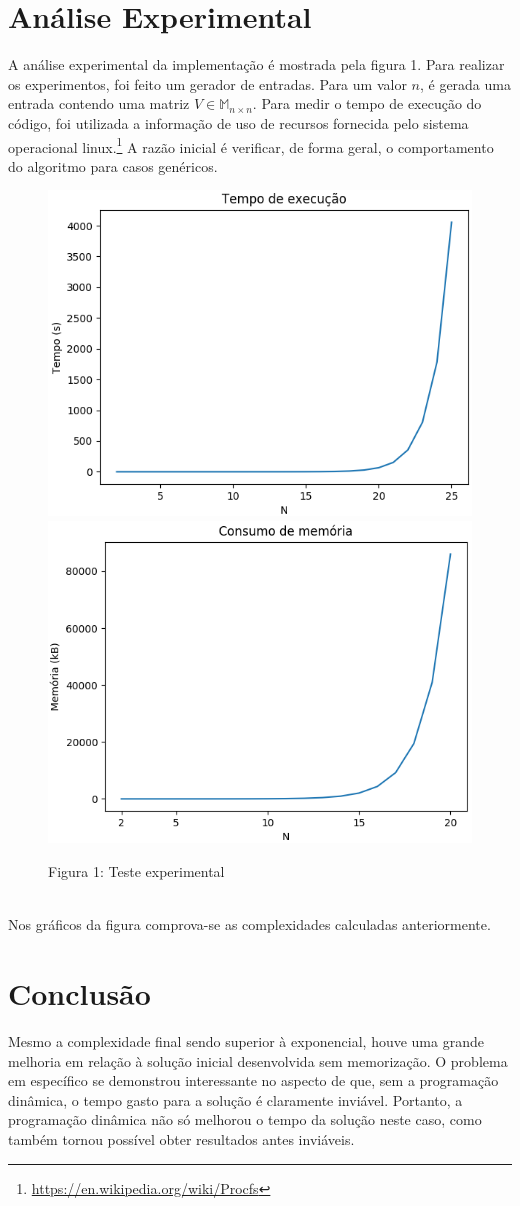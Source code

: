 \documentclass{article}
\begin{document}
\section{Análise Experimental}
A análise experimental da implementação é mostrada pela figura 1. Para realizar os experimentos, foi feito um gerador de entradas. Para um valor $n$, é gerada uma entrada contendo uma matriz $V \in \mathbb{M}_{n \times n}$. Para medir o tempo de execução do código, foi utilizada a informação de uso de recursos fornecida pelo sistema operacional linux.\footnote{\url{https://en.wikipedia.org/wiki/Procfs}} A razão inicial é verificar, de forma geral, o comportamento do algoritmo para casos genéricos.
\vspace{-10pt}
\begin{figure}[h]
  \centering
  \includegraphics[width=0.49\linewidth]{images/time.png}
  \includegraphics[width=0.49\linewidth]{images/space.png}
  \caption{Figura 1: Teste experimental}
\end{figure}\\
Nos gráficos da figura comprova-se as complexidades calculadas anteriormente.


\section{Conclusão}
Mesmo a complexidade final sendo superior à exponencial, houve uma grande melhoria em relação à solução inicial desenvolvida sem memorização. O problema em específico se demonstrou interessante no aspecto de que, sem a programação dinâmica, o tempo gasto para a solução é claramente inviável. Portanto, a programação dinâmica não só melhorou o tempo da solução neste caso, como também tornou possível obter resultados antes inviáveis.
\end{document}
